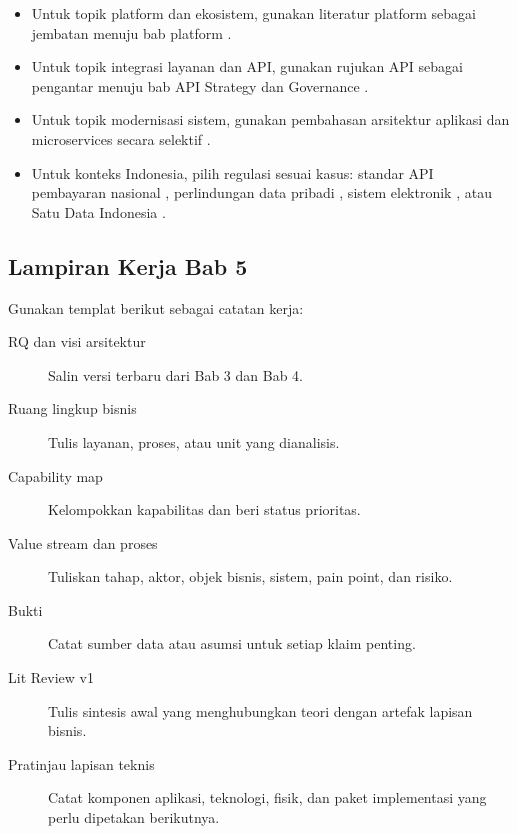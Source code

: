\begin{itemize}
  \item Untuk topik platform dan ekosistem, gunakan literatur platform sebagai
        jembatan menuju bab platform \cite{parker2016platform,cusumano2019business}.
  \item Untuk topik integrasi layanan dan API, gunakan rujukan API sebagai
        pengantar menuju bab API Strategy dan Governance
        \cite{jacobson2011apis,medjaoui2018continuous}.
  \item Untuk topik modernisasi sistem, gunakan pembahasan arsitektur aplikasi
        dan microservices secara selektif \cite{newman2021building}.
  \item Untuk konteks Indonesia, pilih regulasi sesuai kasus: standar API
        pembayaran nasional \cite{snapbi}, perlindungan data pribadi
        \cite{uupdp2022}, sistem elektronik \cite{pp712019}, atau Satu Data
        Indonesia \cite{satudata}.
\end{itemize}

\subsection*{Lampiran Kerja Bab 5}

Gunakan templat berikut sebagai catatan kerja:

\begin{description}
  \item[RQ dan visi arsitektur] Salin versi terbaru dari Bab 3 dan Bab 4.
  \item[Ruang lingkup bisnis] Tulis layanan, proses, atau unit yang dianalisis.
  \item[Capability map] Kelompokkan kapabilitas dan beri status prioritas.
  \item[Value stream dan proses] Tuliskan tahap, aktor, objek bisnis, sistem,
        pain point, dan risiko.
  \item[Bukti] Catat sumber data atau asumsi untuk setiap klaim penting.
  \item[Lit Review v1] Tulis sintesis awal yang menghubungkan teori dengan
        artefak lapisan bisnis.
  \item[Pratinjau lapisan teknis] Catat komponen aplikasi, teknologi, fisik, dan
        paket implementasi yang perlu dipetakan berikutnya.
\end{description}
\setlength{\emergencystretch}{0pt}
